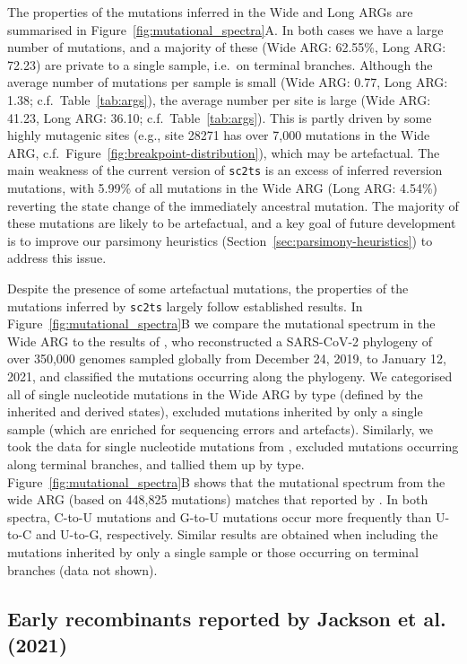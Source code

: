 \documentclass{article}
\begin{document}
The properties of the mutations inferred in the Wide and Long
ARGs are summarised in Figure~\ref{fig:mutational_spectra}A. In both
cases we have a large number of mutations, and a majority of these
(Wide ARG: 62.55\%, Long ARG: 72.23) are private to a single
sample, i.e.\ on terminal branches.
Although the average number
of mutations per sample is small
(Wide ARG: 0.77, Long ARG: 1.38; c.f.\ Table~\ref{tab:args}), the average number per site
is large (Wide ARG: 41.23, Long ARG: 36.10; c.f.\ Table~\ref{tab:args}). This is
partly driven by some highly mutagenic sites (e.g., site 28271 has over 7,000
mutations in the Wide ARG, c.f.\ Figure~\ref{fig:breakpoint-distribution}), which
may be artefactual.
The main weakness of the current version of \texttt{sc2ts} is an excess
of inferred reversion mutations, with 5.99\% of all mutations in the Wide
ARG (Long ARG: 4.54\%) reverting the state change of the immediately
ancestral mutation. The majority of these mutations are likely to be
artefactual, and a key goal of future development is to improve
our parsimony heuristics (Section~\ref{sec:parsimony-heuristics}) to
address this issue.

Despite the presence of some artefactual mutations,
the properties of the mutations inferred by \texttt{sc2ts} largely follow
established results.
In Figure~\ref{fig:mutational_spectra}B we compare the mutational spectrum
in the Wide ARG to the results of \cite{Yi2021-sc},
who reconstructed a SARS-CoV-2 phylogeny of
over 350,000 genomes sampled globally from December 24, 2019, to January 12,
2021, and classified the mutations occurring along the phylogeny.
We categorised all of single nucleotide
mutations in the Wide ARG by type (defined by the inherited and derived states),
excluded mutations inherited by only a single sample (which are
enriched for sequencing errors and artefacts).
Similarly, we took the data for single nucleotide mutations from
\citep[][\url{https://github.com/ju-lab/SC2_evol_signature}]{Yi2021-sc}, excluded
mutations occurring along terminal branches, and tallied them up by type.
Figure~\ref{fig:mutational_spectra}B shows that the mutational spectrum from the
wide ARG (based on 448,825 mutations) matches that reported by \citet[based on
92,344 mutations]{Yi2021-sc}. In both spectra, C-to-U mutations and G-to-U
mutations occur more frequently than U-to-C and U-to-G, respectively. Similar
results are obtained when including the mutations inherited by only a single
sample or those occurring on terminal branches (data not shown).

\subsection{Early recombinants reported by Jackson et al. (2021)}
\label{sec:jackson_recombs}
\end{document}
